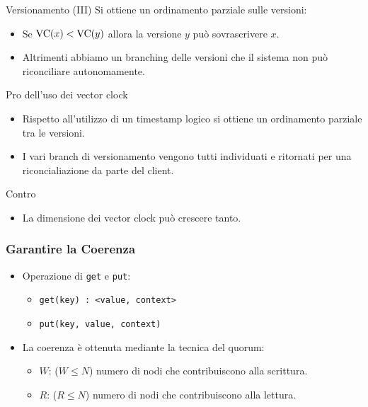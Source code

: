 \begin{frame}{Versionamento (III)}
  Si ottiene un ordinamento parziale sulle versioni:
  \begin{itemize}
  \item Se $\mathrm{VC}(x) < \mathrm{VC}(y)$ allora la versione $y$ può sovrascrivere $x$.
  \item Altrimenti abbiamo un branching delle versioni che il sistema non può riconciliare autonomamente.
  \end{itemize}
 
  \begin{block}{Pro dell'uso dei vector clock}
    \begin{itemize}
    \item Rispetto all'utilizzo di un timestamp logico si ottiene un ordinamento parziale tra le versioni.
    \item I vari branch di versionamento vengono tutti individuati e ritornati per una riconcialiazione da parte del client.
    \end{itemize}
  \end{block}

  \begin{block}{Contro}
    \begin{itemize}
    \item La dimensione dei vector clock può crescere tanto.
    \end{itemize}
  \end{block}
\end{frame}


\begin{frame}
  \frametitle{Garantire la Coerenza}
  \begin{itemize}
  \item Operazione di \texttt{get} e \texttt{put}:
    \begin{itemize}
    \item \texttt{get(key) : <value, context>}
    \item \texttt{put(key, value, context)}
    \end{itemize}
  \end{itemize}
  \begin{itemize}
  \item La coerenza è ottenuta mediante la tecnica del \alert{quorum}:
    \begin{itemize}
    \item $W$: ($W \leq N$) numero di nodi che contribuiscono alla scrittura.
    \item $R$: ($R \leq N$) numero di nodi che contribuiscono alla lettura.
    \end{itemize}
  \end{itemize}
\end{frame}


